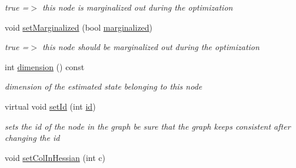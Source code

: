 \begin{DoxyCompactItemize}
\begin{DoxyCompactList}\small\item\em true =$>$ this node is marginalized out during the optimization \end{DoxyCompactList}\item 
\hypertarget{classg2o_1_1OptimizableGraph_1_1Vertex_afabf1782886c78bf7b312bb1f2c90524}{void \hyperlink{classg2o_1_1OptimizableGraph_1_1Vertex_afabf1782886c78bf7b312bb1f2c90524}{set\-Marginalized} (bool \hyperlink{classg2o_1_1OptimizableGraph_1_1Vertex_a214c01f0b3cab575f3496be729f6ccb1}{marginalized})}\label{classg2o_1_1OptimizableGraph_1_1Vertex_afabf1782886c78bf7b312bb1f2c90524}

\begin{DoxyCompactList}\small\item\em true =$>$ this node should be marginalized out during the optimization \end{DoxyCompactList}\item 
\hypertarget{classg2o_1_1OptimizableGraph_1_1Vertex_a1037b978fec531eaf860d0037b992079}{int \hyperlink{classg2o_1_1OptimizableGraph_1_1Vertex_a1037b978fec531eaf860d0037b992079}{dimension} () const }\label{classg2o_1_1OptimizableGraph_1_1Vertex_a1037b978fec531eaf860d0037b992079}

\begin{DoxyCompactList}\small\item\em dimension of the estimated state belonging to this node \end{DoxyCompactList}\item 
\hypertarget{classg2o_1_1OptimizableGraph_1_1Vertex_ac57651173d6ce4bb4eebf8cb1d917551}{virtual void \hyperlink{classg2o_1_1OptimizableGraph_1_1Vertex_ac57651173d6ce4bb4eebf8cb1d917551}{set\-Id} (int \hyperlink{classg2o_1_1HyperGraph_1_1Vertex_ad76b71c368b71971ac5affb5d57183d3}{id})}\label{classg2o_1_1OptimizableGraph_1_1Vertex_ac57651173d6ce4bb4eebf8cb1d917551}

\begin{DoxyCompactList}\small\item\em sets the id of the node in the graph be sure that the graph keeps consistent after changing the id \end{DoxyCompactList}\item 
\hypertarget{classg2o_1_1OptimizableGraph_1_1Vertex_aa605891d46b99ed97accf659f10bc8d5}{void \hyperlink{classg2o_1_1OptimizableGraph_1_1Vertex_aa605891d46b99ed97accf659f10bc8d5}{set\-Col\-In\-Hessian} (int c)}\label{classg2o_1_1OptimizableGraph_1_1Vertex_aa605891d46b99ed97accf659f10bc8d5}


\end{DoxyCompactItemize}
